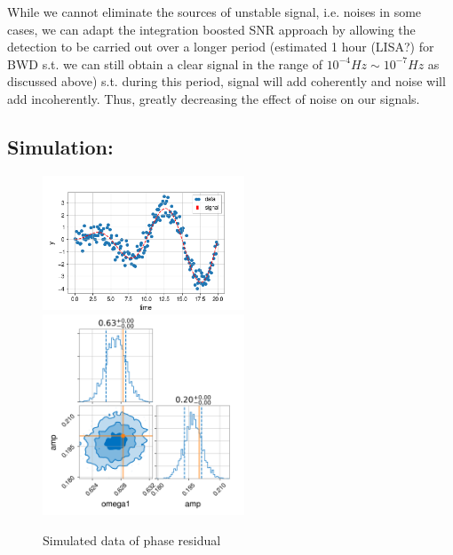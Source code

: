 \documentclass{article}
\begin{document}
While we cannot eliminate the sources of unstable signal, i.e. noises in some cases, we can adapt the integration boosted SNR approach by allowing the detection to be carried out over a longer period (estimated 1 hour (LISA?) for BWD s.t. we can still obtain a clear signal in the range of $10^{-4}Hz\sim 10^{-7}Hz$ as discussed above) s.t. during this period, signal will add coherently and noise will add incoherently. Thus, greatly decreasing the effect of noise on our signals.



\subsection{Simulation:}

\begin{figure}[H]
    \centering
    \includegraphics[width=6cm]{data.png}
    \includegraphics[width=6cm]{corner.png}
    \caption{Simulated data of phase residual}
    \label{fig:h1kpc}
\end{figure}

\printbibliography

%
\end{document}
